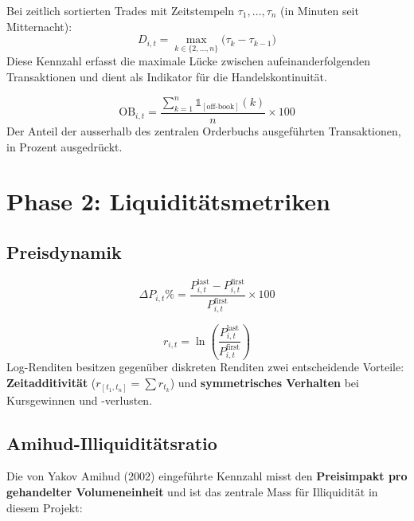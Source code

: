 \documentclass[12pt, a4paper, oneside]{report}
\begin{document}
\begin{mathbox}
Bei zeitlich sortierten Trades mit Zeitstempeln $\tau_1, \ldots, \tau_{n}$ (in Minuten seit Mitternacht):
\[
  D_{i,t} = \max_{k \in \{2,\ldots,n\}} \bigl(\tau_k - \tau_{k-1}\bigr)
\]
Diese Kennzahl erfasst die maximale L\"ucke zwischen aufeinanderfolgenden Transaktionen und dient als Indikator f\"ur die Handelskontinuit\"at.
\end{mathbox}

\begin{mathbox}
\[
  \text{OB}_{i,t} = \frac{\sum_{k=1}^{n} \mathbb{1}_{[\text{off-book}]}(k)}{n} \times 100
\]
Der Anteil der ausserhalb des zentralen Orderbuchs ausgef\"uhrten Transaktionen, in Prozent ausgedr\"uckt.
\end{mathbox}

\section{Phase 2: Liquidit\"atsmetriken}

\subsection{Preisdynamik}

\begin{mathbox}
\[
  \Delta P_{i,t}\% = \frac{P_{i,t}^{\text{last}} - P_{i,t}^{\text{first}}}{P_{i,t}^{\text{first}}} \times 100
\]
\end{mathbox}

\begin{mathbox}
\[
  r_{i,t} = \ln\!\left(\frac{P_{i,t}^{\text{last}}}{P_{i,t}^{\text{first}}}\right)
\]
Log-Renditen besitzen gegen\"uber diskreten Renditen zwei entscheidende Vorteile: \textbf{Zeitadditivit\"at} ($r_{[t_1, t_n]} = \sum r_{t_k}$) und \textbf{symmetrisches Verhalten} bei Kursgewinnen und -verlusten.
\end{mathbox}

\subsection{Amihud-Illiquidit\"atsratio}

Die von Yakov Amihud (2002) eingef\"uhrte Kennzahl misst den \textbf{Preisimpakt pro gehandelter Volumeneinheit} und ist das zentrale Mass f\"ur Illiquidit\"at in diesem Projekt:
\end{document}
